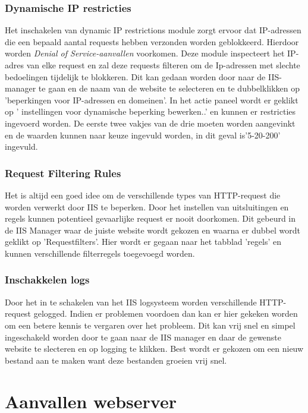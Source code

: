 \documentclass[pdftex,a4paper,12pt]{report}
\begin{document}
\subsection{Dynamische IP restricties}
Het inschakelen van dynamic IP restrictions module zorgt ervoor dat IP-adressen die een bepaald aantal requests hebben verzonden worden geblokkeerd. Hierdoor worden \textit{Denial of Service-aanvallen} voorkomen. Deze module inspecteert het IP-adres van elke request en zal deze requests filteren om de Ip-adressen met slechte bedoelingen tijdelijk te blokkeren. Dit kan gedaan worden door naar de IIS-manager te gaan en de naam van de website te selecteren en te dubbelklikken op 'beperkingen voor IP-adressen en domeinen'. In het actie paneel wordt er geklikt op '
instellingen voor dynamische beperking bewerken..' en kunnen er restricties ingevoerd worden. De eerste twee vakjes van de drie moeten worden aangevinkt en de waarden kunnen naar keuze ingevuld worden, in dit geval is'5-20-200' ingevuld. 

\subsection{Request Filtering Rules}
Het is altijd een goed idee om de verschillende types van HTTP-request die worden verwerkt door IIS te beperken. Door het instellen van uitsluitingen en regels kunnen potentieel gevaarlijke request er nooit doorkomen. Dit gebeurd in de IIS Manager waar de juiste website wordt gekozen en waarna er dubbel wordt geklikt op 'Requestfilters'. Hier wordt er gegaan naar het tabblad 'regels' en kunnen verschillende filterregels toegevoegd worden.

\subsection{Inschakkelen logs}
Door het in te schakelen van het IIS logsysteem worden verschillende HTTP-request gelogged. Indien er problemen voordoen dan kan er hier gekeken worden om een betere kennis te vergaren over het probleem. Dit kan vrij snel en simpel ingeschakeld worden door te gaan naar de IIS manager en daar de gewenste website te slecteren en op logging te klikken. Best wordt er gekozen om een nieuw bestand aan te maken want deze bestanden groeien vrij snel.


\chapter{Aanvallen webserver}
\end{document}
